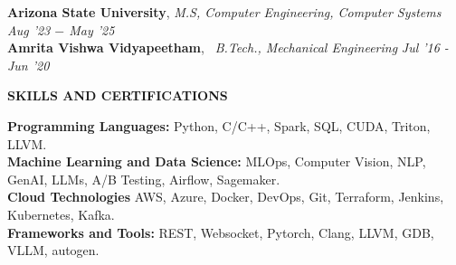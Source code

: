 \documentclass[10pt,a4]{article}
\begin{document}
{\begin{flushleft}
    	\hspace{1.5mm} \textbf{\large Arizona State University}, \textit{M.S, Computer Engineering, Computer Systems}  \hfill \textit{Aug '23 $-$ May '25}	\\
        
        \hspace{1.5mm} \textbf{\large Amrita Vishwa Vidyapeetham}, \textit{\ B.Tech., Mechanical Engineering} \hfill \textit{ Jul '16 - Jun '20}	\\

\end{flushleft}

\begin{flushleft}
    {\Large \textbf {SKILLS AND CERTIFICATIONS}}
    
            \hspace{0.5cm}  \textbf{Programming Languages:} Python, C/C++, Spark, SQL, CUDA, Triton, LLVM. \\
            \hspace{0.5cm}  \textbf{Machine Learning and Data Science:} MLOps, Computer Vision, NLP, GenAI, LLMs, A/B Testing, Airflow, Sagemaker. \\
            \hspace{0.5cm}  \textbf{Cloud Technologies} AWS, Azure, Docker, DevOps, Git, Terraform, Jenkins, Kubernetes, Kafka. \\
            \hspace{0.5cm}  \textbf{Frameworks and Tools:} REST, Websocket, Pytorch, Clang, LLVM, GDB, VLLM, autogen. \\

        

\end{flushleft}
		
}
\end{document}
